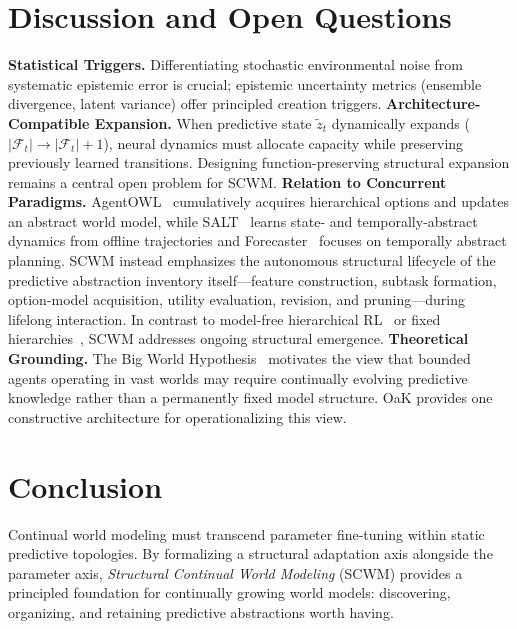\documentclass{article}
\theoremstyle{definition}
\begin{document}
\section{Discussion and Open Questions}
\label{sec:discussion}

\textbf{Statistical Triggers.} Differentiating stochastic environmental noise from systematic epistemic error is crucial; epistemic uncertainty metrics (ensemble divergence, latent variance) offer principled creation triggers.
\textbf{Architecture-Compatible Expansion.} When predictive state $\tilde{z}_t$ dynamically expands ($|\mathcal{F}_t| \to |\mathcal{F}_t|+1$), neural dynamics must allocate capacity while preserving previously learned transitions. Designing function-preserving structural expansion remains a central open problem for SCWM.
\textbf{Relation to Concurrent Paradigms.} AgentOWL~\citep{piriyakulkij2026agentowl} cumulatively acquires hierarchical options and updates an abstract world model, while SALT~\citep{huang2026learning} learns state- and temporally-abstract dynamics from offline trajectories and Forecaster~\citep{jiralerspong2023forecaster} focuses on temporally abstract planning. SCWM instead emphasizes the autonomous structural lifecycle of the predictive abstraction inventory itself---feature construction, subtask formation, option-model acquisition, utility evaluation, revision, and pruning---during lifelong interaction. In contrast to model-free hierarchical RL~\citep{bacon2017option} or fixed hierarchies~\citep{schiewer2024exploring, hansen2024hierarchical}, SCWM addresses ongoing structural emergence.
\textbf{Theoretical Grounding.} The Big World Hypothesis~\citep{javed2024bigworld, lewandowski2025world, elelimy2025rethinking, kumar2023continual} motivates the view that bounded agents operating in vast worlds may require continually evolving predictive knowledge rather than a permanently fixed model structure. OaK provides one constructive architecture for operationalizing this view.

\section{Conclusion}
\label{sec:conclusion}

Continual world modeling must transcend parameter fine-tuning within static predictive topologies. By formalizing a structural adaptation axis alongside the parameter axis, \emph{Structural Continual World Modeling} (SCWM) provides a principled foundation for continually growing world models: discovering, organizing, and retaining predictive abstractions worth having.
\end{document}
